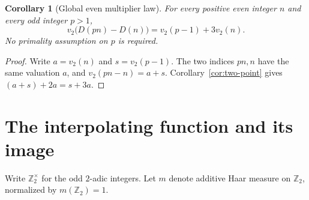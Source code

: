 \documentclass[11pt]{article}
\newtheorem{corollary}[theorem]{Corollary}
\theoremstyle{remark}\newtheorem{remark}[theorem]{Remark}
\newcommand{\Ztwo}{\mathbb Z_2}\newcommand{\Qtwo}{\mathbb Q_2}
\begin{document}
\begin{corollary}[Global even multiplier law]\label{cor:multiplier}
For every positive even integer $n$ and every odd integer $p>1$,
\[
\boxed{v_2\bigl(D(pn)-D(n)\bigr)=v_2(p-1)+3v_2(n).}
\]
No primality assumption on $p$ is required.
\end{corollary}
\begin{proof}
Write $a=v_2(n)$ and $s=v_2(p-1)$. The two indices $pn,n$ have
the same valuation $a$, and
$v_2(pn-n)=a+s$. Corollary~\ref{cor:two-point} gives
$(a+s)+2a=s+3a$.
\end{proof}

\section{The interpolating function and its image}\label{sec:image}
Write $\Ztwo^\times$ for the odd $2$-adic integers. Let $m$ denote
additive Haar measure on $\Ztwo$, normalized by $m(\Ztwo)=1$.
\end{document}
